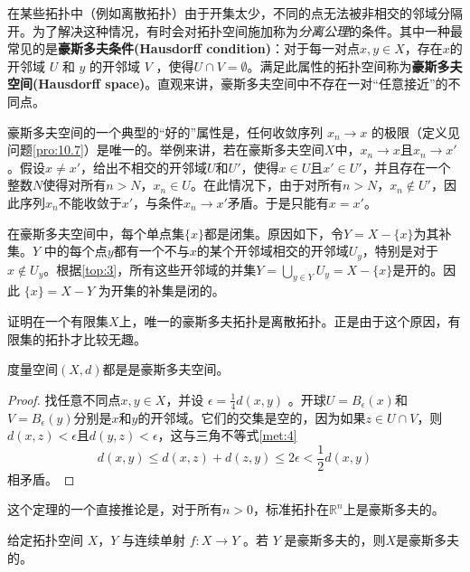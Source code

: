 在某些拓扑中（例如离散拓扑）由于开集太少，不同的点无法被非相交的邻域分隔开。为了解决这种情况，有时会对拓扑空间施加称为\emph{分离公理}的条件。其中一种最常见的是\textbf{豪斯多夫条件(Hausdorff condition)}：对于每一对点$x,y\in X$，存在$x$的开邻域 $U$ 和 $y$ 的开邻域 $V$ ，使得$U\cap V=\emptyset $。满足此属性的拓扑空间称为\textbf{豪斯多夫空间(Hausdorff space)}。直观来讲，豪斯多夫空间中不存在一对“任意接近”的不同点。

豪斯多夫空间的一个典型的“好的”属性是，任何收敛序列 $x_{n}\rightarrow x$ 的极限（定义见问题\ref{pro:10.7}）是唯一的。举例来讲，若在豪斯多夫空间$X$中，$x_{n}\rightarrow x$且$x_{n}\rightarrow x'$。假设$x\neq x'$，给出不相交的开邻域$U$和$U'$，使得$x\in U$且$x'\in U'$，并且存在一个整数$N$使得对所有$n >N$，$x_{n} \in U$。在此情况下，由于对所有$n >N$，$x_{n} \notin U'$，因此序列$x_{n}$不能收敛于$x'$，与条件$x_{n}\rightarrow x'$矛盾。于是只能有$x=x'$。

在豪斯多夫空间中，每个单点集$\{x\}$都是闭集。原因如下，令$Y=X-\{x\}$为其补集。$Y$ 中的每个点$y$都有一个不与$x$的某个开邻域相交的开邻域$U_{y}$，特别是对于$x\notin U_{y}$。根据\ref{top:3}，所有这些开邻域的并集$Y=\bigcup _{y\in Y} U_{y} =X-\{x\}$是开的。因此 $\{x\}=X-Y$ 为开集的补集是闭的。

\begin{exercise}
	证明在一个有限集$X$上，唯一的豪斯多夫拓扑是离散拓扑。正是由于这个原因，有限集的拓扑才比较无趣。
\end{exercise}

\begin{theorem}\label{eg:10.4}
	度量空间$(X,d)$都是是豪斯多夫空间。
\end{theorem}

\begin{proof}
	找任意不同点$x,y\in X$，并设 $\epsilon =\frac{1}{4} d(x,y)$ 。开球$U=B_{\epsilon } (x)$和$V=B_{\epsilon } (y)$分别是$x$和$y$的开邻域。它们的交集是空的，因为如果$z\in U\cap V$，则$d(x,z)< \epsilon $且$d(y,z)< \epsilon $，这与三角不等式\ref{met:4}
\begin{equation*}
    d(x,y)\leq d(x,z)+d(z,y)\leq 2\epsilon < \frac{1}{2} d(x,y)
\end{equation*}
相矛盾。
\end{proof}

这个定理的一个直接推论是，对于所有$n >0$，标准拓扑在$\mathbb{R}^{n}$上是豪斯多夫的。

\begin{theorem}\label{eg:10.5}
	给定拓扑空间 $X$，$Y$ 与连续单射 $f:X\rightarrow Y$ 。若 $Y$ 是豪斯多夫的，则$X$是豪斯多夫的。
\end{theorem}

